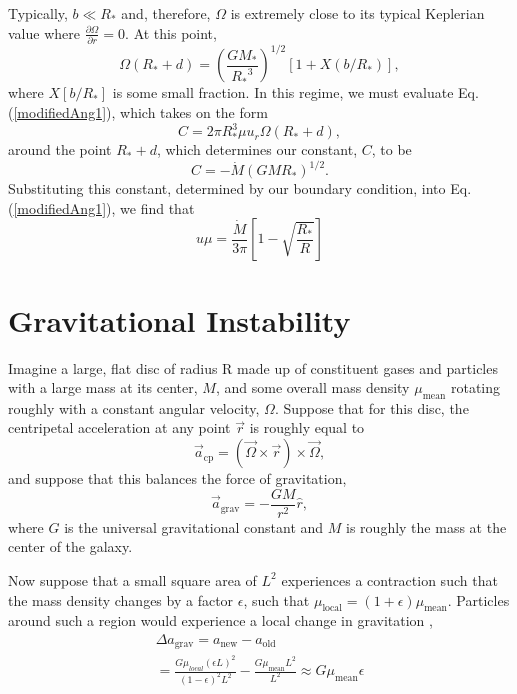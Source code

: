 \documentclass[aps,pra,twocolumn]{revtex4-1}
\begin{document}
Typically, $b \ll R_*$ and, therefore, $\Omega$ is extremely close to its typical Keplerian value where $\frac{\partial \Omega}{\partial r} = 0$.  At this point,
\begin{equation}
\Omega(R_* + d) = \left(\frac{GM_*}{{R_*}^3} \right)^{1/2} \left[1 + X(b/R_*) \right],
\end{equation}
where $X[b/R_*]$ is some small fraction.  In this regime, we must evaluate Eq. (\ref{modifiedAng1}), which takes on the form
\begin{equation}
C = 2\pi R_*^3 \mu u_r \Omega(R_* + d) , \nonumber
\end{equation}
around the point $R_* + d$, which determines our constant, $C$, to be
\begin{equation}
C = - \dot{M}(G M R_*)^{1/2}. \nonumber
\end{equation}
Substituting this constant, determined by our boundary condition, into Eq. (\ref{modifiedAng1}), we find that
\begin{equation}
u \mu = \frac{\dot{M}}{3\pi}\left[ 1 - \sqrt{\frac{R_*}{R}} \right]
\end{equation}

\section{\label{section 3} Gravitational Instability}
Imagine a large, flat disc of radius R made up of constituent gases and particles with a large mass at its center, $M$, and some overall mass density $\mu_{\text{mean}}$ rotating roughly with a constant angular velocity, $\Omega$. Suppose that for this disc, the centripetal acceleration at any point $\vec{r}$ is roughly equal to 
\begin{equation}
\vec{a}_{\text{cp}} = \left( \vec{\Omega} \times \vec{r} \right) \times \vec{\Omega} ,
\end{equation}
and suppose that this balances the force of gravitation,
\begin{equation}
\vec{a}_{\text{grav}} = -\frac{G M}{r^2}\hat{r},
\end{equation}
where $G$ is the universal gravitational constant and $M$ is roughly the mass at the center of the galaxy.

Now suppose that a small square area of $L^2$ experiences a contraction such that the mass density changes by a factor $\epsilon$, such that $\mu_{\text{local}} = (1+\epsilon) \mu_{\text{mean}}$. Particles around such a region would experience a local change in gravitation \cite{toomre1964},
\begin{multline}
\Delta a_{\text{grav}} = a_{\text{new}} - a_{\text{old}} \\
= \frac{G \mu_{local}(\epsilon L)^2}{(1-\epsilon)^2 L^2} - \frac{G\mu_{\text{mean}} L^2}{L^2}
\approx G \mu_{\text{mean}}\epsilon
\end{multline}
\end{document}
